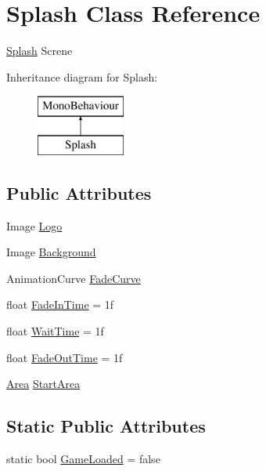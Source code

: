 \hypertarget{class_splash}{}\section{Splash Class Reference}
\label{class_splash}


\mbox{\hyperlink{class_splash}{Splash}} Screne  


Inheritance diagram for Splash\+:\begin{figure}[H]
\begin{center}
\leavevmode
\includegraphics[height=2.000000cm]{class_splash}
\end{center}
\end{figure}
\subsection*{Public Attributes}
\begin{DoxyCompactItemize}
\item 
Image \mbox{\hyperlink{class_splash_ab1b30c9ae1e8d9c32eceda9df2946687}{Logo}}
\item 
Image \mbox{\hyperlink{class_splash_a8aa680e0ccdf3e60f38904be2927fe62}{Background}}
\item 
Animation\+Curve \mbox{\hyperlink{class_splash_aefd5da39acda17b72a9587bed7f0cb00}{Fade\+Curve}}
\item 
float \mbox{\hyperlink{class_splash_a3c3bb4bb75f5d69ec4d716c2eb907d2a}{Fade\+In\+Time}} = 1f
\item 
float \mbox{\hyperlink{class_splash_aab9712e04bfa3cd947ca0f5a09cc25f0}{Wait\+Time}} = 1f
\item 
float \mbox{\hyperlink{class_splash_ab96945b1edacf1b809cc117cf5411d95}{Fade\+Out\+Time}} = 1f
\item 
\mbox{\hyperlink{class_area}{Area}} \mbox{\hyperlink{class_splash_ac323127b3735b94bdc15f4c4e8c54659}{Start\+Area}}
\end{DoxyCompactItemize}
\subsection*{Static Public Attributes}
\begin{DoxyCompactItemize}
\item 
static bool \mbox{\hyperlink{class_splash_a9eafc84b9c0059feeeb4276473441d27}{Game\+Loaded}} = false
\end{DoxyCompactItemize}


